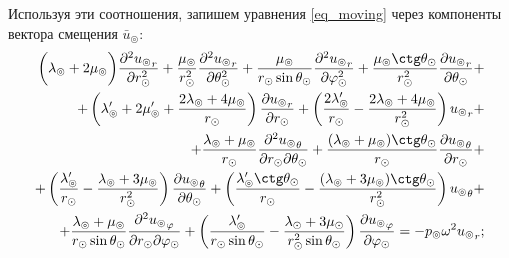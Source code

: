 Используя эти соотношения, запишем уравнения \eqref{eq_moving} через компоненты вектора смещения $\bar{u}_\circledcirc$:
\begin{equation*}
\begin{split}
\biggl(\lambda_\circledcirc+2\mu_\circledcirc\biggr)\frac{\partial^2 {u_\circledcirc}_r}{\partial r_\odot^2} + \frac{\mu_\circledcirc}{r_\odot^2}\frac{\partial^2 {u_\circledcirc}_r}{\partial\theta_\odot^2} +\frac{\mu_\circledcirc}{r_\odot\sin\theta_\odot}\frac{\partial^2 {u_\circledcirc}_r}{\partial\varphi_\odot^2} + \frac{\mu_\circledcirc\ctg\theta_\odot}{r_\odot^2}\frac{\partial {u_\circledcirc}_r}{\partial \theta_\odot} + \\
+ \left(\lambda_\circledcirc'+2\mu_\circledcirc'+\frac{2\lambda_\circledcirc+4\mu_\circledcirc}{r_\odot}\right)\frac{\partial{u_\circledcirc}_r}{\partial r_\odot} + \left(\frac{2\lambda_\circledcirc'}{r_\odot} - \frac{2\lambda_\circledcirc+4\mu_\circledcirc}{r_\odot^2}\right){u_\circledcirc}_r + \\
+ \frac{\lambda_\circledcirc+\mu_\circledcirc}{r_\odot}\frac{\partial^2 {u_\circledcirc}_\theta}{\partial r_\odot\partial\theta_\odot} + \frac{(\lambda_\circledcirc+\mu_\circledcirc)\ctg\theta_\odot}{r_\odot}\frac{\partial {u_\circledcirc}_\theta}{\partial r_\odot} + \\ 
+ \left(\frac{\lambda_\circledcirc'}{r_\odot} - \frac{\lambda_\circledcirc+3\mu_\circledcirc}{r_\odot^2}\right)\frac{\partial {u_\circledcirc}_\theta}{\partial \theta_\odot} +\left(\frac{\lambda_\circledcirc'\ctg\theta_\odot}{r_\odot} - \frac{(\lambda_\circledcirc+3\mu_\circledcirc)\ctg\theta_\odot}{r_\odot^2}\right){u_\circledcirc}_\theta + \\
+\frac{\lambda_\circledcirc+\mu_\circledcirc}{r_\odot\sin\theta_\odot}\frac{\partial^2 {u_\circledcirc}_\varphi}{\partial r_\odot\partial\varphi_\odot}
+ \left(\frac{\lambda_\circledcirc'}{r_\odot\sin\theta_\odot} - \frac{\lambda_\odot+3\mu_\odot}{r_\odot^2\sin\theta_\odot}\right)\frac{\partial {u_\circledcirc}_\varphi}{\partial \varphi_\odot} = -p_\circledcirc\omega^2{u_\circledcirc}_r;
\end{split}
\end{equation*}

